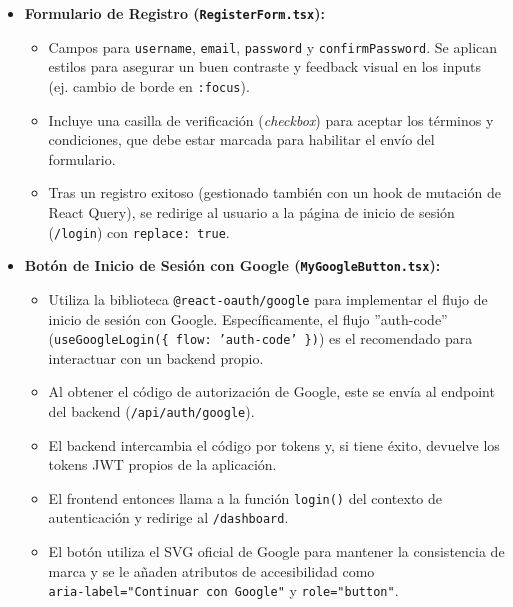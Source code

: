\begin{itemize}[leftmargin=*]
  \item \textbf{Formulario de Registro (\texttt{RegisterForm.tsx}):}
        \begin{itemize}
          \item Campos para \texttt{username}, \texttt{email}, \texttt{password} y \texttt{confirmPassword}. Se aplican estilos para asegurar un buen contraste y feedback visual en los inputs (ej. cambio de borde en \texttt{:focus}).
          \item Incluye una casilla de verificación (\emph{checkbox}) para aceptar los términos y condiciones, que debe estar marcada para habilitar el envío del formulario.
          \item Tras un registro exitoso (gestionado también con un hook de mutación de React Query), se redirige al usuario a la página de inicio de sesión (\texttt{/login}) con \texttt{replace: true}.
        \end{itemize}

  \item \textbf{Botón de Inicio de Sesión con Google (\texttt{MyGoogleButton.tsx}):}
        \begin{itemize}
          \item Utiliza la biblioteca \texttt{@react-oauth/google} para implementar el flujo de inicio de sesión con Google. Específicamente, el flujo ''auth-code'' (\texttt{useGoogleLogin(\{ flow: 'auth-code' \})}) es el recomendado para interactuar con un backend propio.
          \item Al obtener el código de autorización de Google, este se envía al endpoint del backend (\texttt{/api/auth/google}).
          \item El backend intercambia el código por tokens y, si tiene éxito, devuelve los tokens JWT propios de la aplicación.
          \item El frontend entonces llama a la función \texttt{login()} del contexto de autenticación y redirige al \texttt{/dashboard}.
          \item El botón utiliza el SVG oficial de Google para mantener la consistencia de marca y se le añaden atributos de accesibilidad como \\ \texttt{aria-label="Continuar con Google"} y \texttt{role="button"}.
        \end{itemize}


\end{itemize}
